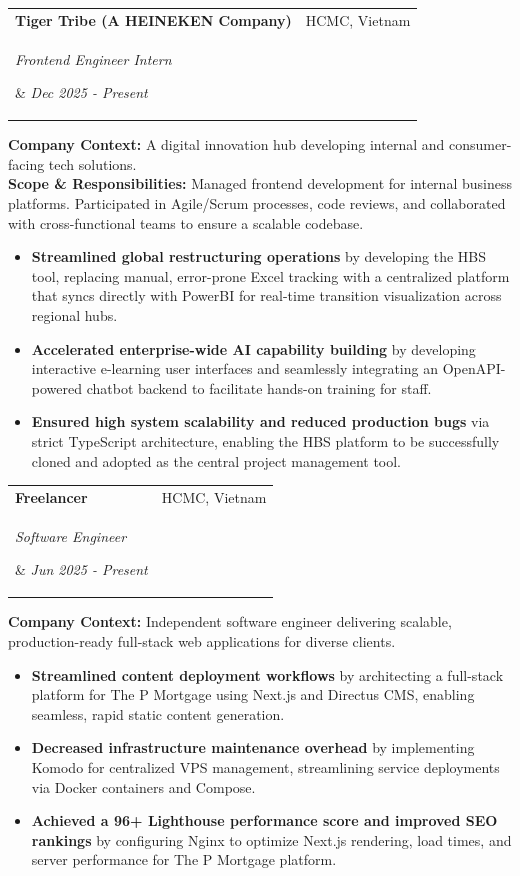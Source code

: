 \documentclass[letterpaper,11pt]{article}
\makeatletter
\newcommand{\resumeSubheading}[4]{\vspace{-1pt}\item
    \begin{tabular*}{0.97\textwidth}[t]{l@{\extracolsep{\fill}}r}
      \textbf{#1} & #2 \\
      \parbox[t]{0.5\textwidth}{\small\itshape#3} & \textit{\small#4} \\
    \end{tabular*}\vspace{-5pt}
}
\newcommand{\resumeItemListStart}{\begin{itemize}[leftmargin=*]}
\newcommand{\resumeItemListEnd}{\end{itemize}\vspace{-5pt}}
\makeatother
\begin{document}
\resumeSubheading
{Tiger Tribe (A HEINEKEN Company)}{HCMC, Vietnam}
{Frontend Engineer Intern}{Dec 2025 - Present}\vspace{-8pt}
\begin{flushleft}\small
 \textbf{Company Context:} A digital innovation hub developing internal and consumer-facing tech solutions.\\
	\textbf{Scope \& Responsibilities:} Managed frontend development for internal business platforms. Participated in Agile/Scrum processes, code reviews, and collaborated with cross-functional teams to ensure a scalable codebase.
\end{flushleft}\vspace{-18pt}
\resumeItemListStart
\item\small{\textbf{Streamlined global restructuring operations} by developing the HBS tool, replacing manual, error-prone Excel tracking with a centralized platform that syncs directly with PowerBI for real-time transition visualization across regional hubs.}
\item\small{\textbf{Accelerated enterprise-wide AI capability building} by developing interactive e-learning user interfaces and seamlessly integrating an OpenAPI-powered chatbot backend to facilitate hands-on training for staff.}
\item\small{\textbf{Ensured high system scalability and reduced production bugs} via strict TypeScript architecture, enabling the HBS platform to be successfully cloned and adopted as the central project management tool.}
\resumeItemListEnd

\resumeSubheading
{Freelancer}{HCMC, Vietnam}
{Software Engineer}{Jun 2025 - Present}\vspace{-8pt}
\begin{flushleft}\small
	\textbf{Company Context:} Independent software engineer delivering scalable, production-ready full-stack web applications for diverse clients.
\end{flushleft}\vspace{-18pt}
\resumeItemListStart
\item\small{\textbf{Streamlined content deployment workflows} by architecting a full-stack platform for The P Mortgage using Next.js and Directus CMS, enabling seamless, rapid static content generation.}
\item\small{\textbf{Decreased infrastructure maintenance overhead} by implementing Komodo for centralized VPS management, streamlining service deployments via Docker containers and Compose.}
\item\small{\textbf{Achieved a 96+ Lighthouse performance score and improved SEO rankings} by configuring Nginx to optimize Next.js rendering, load times, and server performance for The P Mortgage platform.}
\resumeItemListEnd
\end{document}
